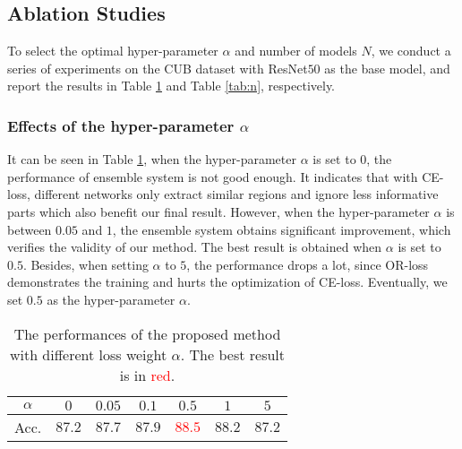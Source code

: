 \documentclass{article}
\begin{document}
\subsection{Ablation Studies}

To select the optimal hyper-parameter $\alpha$ and number of models $N$, we conduct a series of experiments on the CUB dataset with ResNet$50$ as the base model, and report the results in Table \ref{tab:omega} and Table \ref{tab:n}, respectively.

\subsubsection{Effects of the hyper-parameter $\alpha$} 
It can be seen in Table \ref{tab:omega}, when the hyper-parameter $\alpha$ is set to $0$, the performance of ensemble system is not good enough. It indicates that with CE-loss, different networks only extract similar regions and ignore less informative parts which also benefit our final result. However, when the hyper-parameter $\alpha$ is between $0.05$ and $1$, the ensemble system obtains significant improvement, which verifies the validity of our method. The best result is obtained when $\alpha$ is set to $0.5$. Besides, when setting $\alpha$ to $5$, the performance drops a lot, since OR-loss demonstrates the training and hurts the optimization of CE-loss. Eventually, we set $0.5$ as the hyper-parameter $\alpha$.
\begin{table}[!t]
  \centering
        \caption{The performances of the proposed method with different loss weight $\alpha$. The best result is in \textcolor{red}{red}.}
    \vspace{+0.3cm}
    \begin{tabular}{|c|c|c|c|c|c|c|}
    \hline
   $\alpha$ & $0$ & $0.05$ & $0.1$ & $0.5$ & $1$ & $5$ \\
   \hline
   \hline
   Acc. & $87.2$ & $87.7$ & $87.9$ & \textcolor{red}{$88.5$} & $88.2$ & $87.2$ \\
   \hline
    \end{tabular}\label{tab:omega}\end{table}
\end{document}
